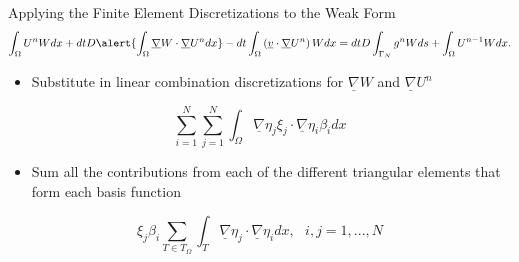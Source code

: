 \documentclass[10pt]{beamer}
\begin{document}
\begin{frame}{Applying the Finite Element Discretizations to the Weak Form} \label{applyingFEMtoweakform}
\footnotesize
\begin{equation}
\int_{\Omega}U^{n}W dx +dtD\alert{\int_{\Omega}\underline{\nabla}W \cdot \underline{\nabla} U^{n} dx}-dt\int_{\Omega}\left(\underline{v}\cdot \underline{\nabla}U^{n}\right)W dx=dtD\int_{\Gamma_{N}}g^{n}W ds+ \int_{\Omega} U^{n-1}W dx.
\end{equation}
\normalsize

\begin{itemize}
\item  Substitute in linear combination discretizations for $\underline{\nabla}W$ and $\underline{\nabla}U^{n}$
\end{itemize}

\begin{equation}
\sum_{i=1}^{N}\sum_{j=1}^{N} \int_{\Omega} \underline{\nabla}\eta_{j} \xi_{j} \cdot \underline{\nabla}\eta_{i} \beta_{i} dx
\end{equation}


\begin{itemize}
\item Sum all the contributions from each of the different triangular elements that form each basis function
\end{itemize}

\begin{equation}
 \xi_{j}\beta_{i}\sum_{T \in T_{\Omega}}\int_{T} \underline{\nabla} \eta_{j} \cdot \underline{\nabla}\eta_{i} dx, \texttt{ } i,j=1,...,N
\end{equation}

\hyperlink{Questions}{}
\end{frame}
\end{document}
